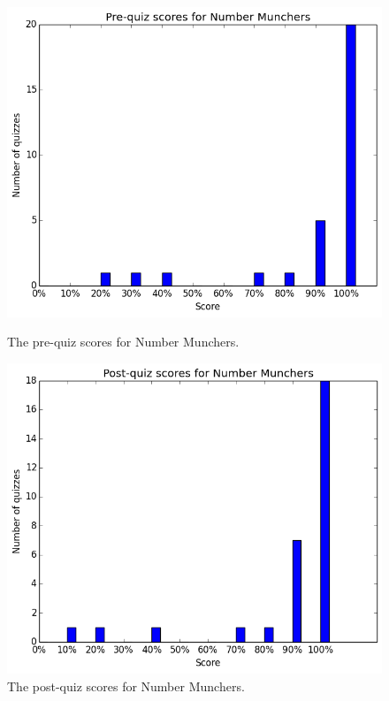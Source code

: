 			\begin{figure}[h] 
			\centering 
			\begin{minipage}[b]{0.45\linewidth}
			\includegraphics[width=\textwidth]{munchers_pre.png} 
			\caption{The pre-quiz scores for Number Munchers.}
			\end{minipage}
			\quad
			\begin{minipage}[b]{0.45\linewidth}
			\includegraphics[width=\textwidth]{munchers_post.png} 
			\caption{The post-quiz scores for Number Munchers.}
			\end{minipage}
			\end{figure}

